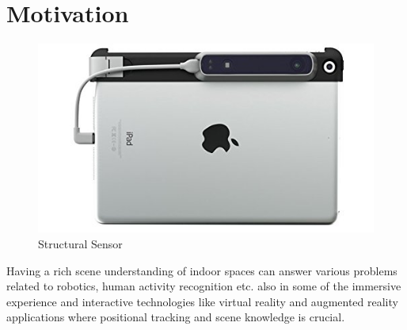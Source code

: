 \section{Motivation}
\begin{figure}[!b]
    \centering
    \includegraphics[width = 12cm]{Figures/ipad.jpg}
    \caption{Structural Sensor}
    \label{fig:Structural_Sensor}
\end{figure}{}

Having a rich scene understanding of indoor spaces can answer various problems related to robotics, human activity recognition etc. also in some of the immersive experience and interactive technologies like  virtual reality and augmented reality applications where positional tracking and scene knowledge is crucial.

